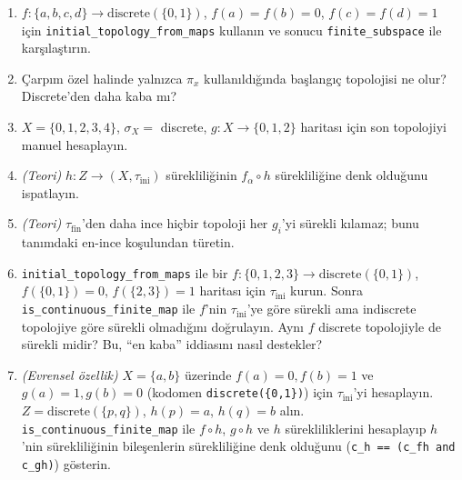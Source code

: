 \begin{enumerate}
  \item $f: \{a,b,c,d\} \to \mathrm{discrete}(\{0,1\})$, $f(a)=f(b)=0$, $f(c)=f(d)=1$
        için \texttt{initial\_topology\_from\_maps} kullanın ve sonucu
        \texttt{finite\_subspace} ile karşılaştırın.

  \item Çarpım özel halinde yalnızca $\pi_x$ kullanıldığında başlangıç topolojisi
        ne olur? Discrete'den daha kaba mı?

  \item $X=\{0,1,2,3,4\}$, $\sigma_X = $ discrete, $g: X \to \{0,1,2\}$ haritası
        için son topolojiyi manuel hesaplayın.

  \item \textit{(Teori)} $h: Z \to (X, \tau_{\mathrm{ini}})$ sürekliliğinin
        $f_\alpha \circ h$ sürekliliğine denk olduğunu ispatlayın.

  \item \textit{(Teori)} $\tau_{\mathrm{fin}}$'den daha ince hiçbir topoloji her
        $g_i$'yi sürekli kılamaz; bunu tanımdaki en-ince koşulundan türetin.

  \item \texttt{initial\_topology\_from\_maps} ile bir
        $f: \{0,1,2,3\} \to \mathrm{discrete}(\{0,1\})$, $f(\{0,1\})=0$,
        $f(\{2,3\})=1$ haritası için $\tau_{\mathrm{ini}}$ kurun. Sonra
        \texttt{is\_continuous\_finite\_map} ile $f$'nin $\tau_{\mathrm{ini}}$'ye göre
        sürekli ama indiscrete topolojiye göre sürekli olmadığını doğrulayın. Aynı
        $f$ discrete topolojiyle de sürekli midir? Bu, ``en kaba'' iddiasını nasıl
        destekler?

  \item \textit{(Evrensel özellik)} $X=\{a,b\}$ üzerinde
        $f(a)=0,f(b)=1$ ve $g(a)=1,g(b)=0$ (kodomen \texttt{discrete(\{0,1\})}) için
        $\tau_{\mathrm{ini}}$'yi hesaplayın. $Z=\mathrm{discrete}(\{p,q\})$,
        $h(p)=a$, $h(q)=b$ alın. \texttt{is\_continuous\_finite\_map} ile
        $f\circ h$, $g\circ h$ ve $h$ sürekliliklerini hesaplayıp $h$'nin
        sürekliliğinin bileşenlerin sürekliliğine denk olduğunu
        (\texttt{c\_h == (c\_fh and c\_gh)}) gösterin.
\end{enumerate}
